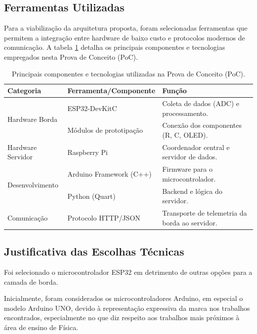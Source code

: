 \subsection{Ferramentas Utilizadas}

Para a viabilização da arquitetura proposta, foram selecionadas ferramentas que permitem a integração entre hardware de baixo custo e protocolos modernos de comunicação. A tabela \ref{tab:ferramentas_poc} detalha os principais componentes e tecnologias empregados nesta Prova de Conceito (PoC).

\begin{table}[ht]
\centering
\caption{Principais componentes e tecnologias utilizadas na Prova de Conceito (PoC).}
\label{tab:ferramentas_poc}
\begin{tabular}{|l|l|p{6cm}|}
\hline
\textbf{Categoria} & \textbf{Ferramenta/Componente} & \textbf{Função} \\ \hline
\multirow{2}{*}{Hardware Borda} & ESP32-DevKitC & Coleta de dados (ADC) e processamento. \\ \cline{2-3}
& Módulos de prototipação & Conexão dos componentes (R, C, OLED). \\ \hline
Hardware Servidor & Raspberry Pi & Coordenador central e servidor de dados. \\ \hline
\multirow{2}{*}{Desenvolvimento} & Arduino Framework (C++) & Firmware para o microcontrolador. \\ \cline{2-3}
& Python (Quart) & Backend e lógica do servidor. \\ \hline
Comunicação & Protocolo HTTP/JSON & Transporte de telemetria da borda ao servidor. \\ \hline
\end{tabular}
\end{table}

\subsection{Justificativa das Escolhas Técnicas}
Foi selecionado o microcontrolador ESP32 em detrimento de outras opções para a camada de borda.

Inicialmente, foram considerados os microcontroladores Arduino, em especial o modelo Arduino UNO, devido à representação expressiva da marca nos trabalhos encontrados, especialmente no que diz respeito aos trabalhos mais próximos à área de ensino de Física.

